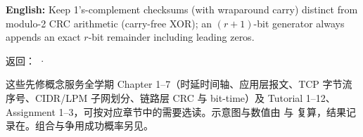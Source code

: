 \textbf{English:} Keep 1's-complement checksums (with wraparound carry) distinct from modulo-2 CRC arithmetic (carry-free XOR); an \((r+1)\)-bit generator always appends an exact \(r\)-bit remainder including leading zeros.


返回： · 





这些先修概念服务全学期 Chapter 1–7（时延时间轴、应用层报文、TCP 字节流序号、CIDR/LPM 子网划分、链路层 CRC 与 bit-time）及 Tutorial 1–12、Assignment 1–3，可按对应章节中的需要选读。示意图与数值由  与  复算，结果记录在。组合与争用成功概率另见。
